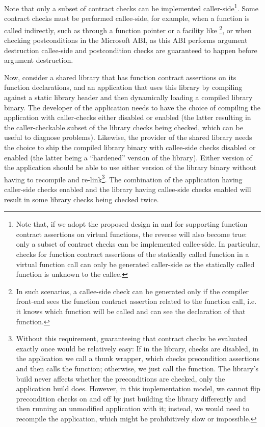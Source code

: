 Note that only a subset of contract checks can be implemented caller-side\footnote{Note that, if we adopt the proposed design in \cite{P3097R0} and \cite{P3165R0} for supporting function contract assertions on virtual functions, the reverse will also become true: only a subset of contract checks can be implemented callee-side. In particular, checks for function contract assertions of the statically called function in a virtual function call can only be generated caller-side as the statically called function is unknown to the callee.}. Some contract checks must be performed callee-side, for example, when a function is called indirectly, such as through a function pointer or a facility like \footnote{In such scenarios, a callee-side check can be generated only if the compiler front-end sees the function contract assertion related to the function call, i.e. it knows which function will be called and can see the declaration of that function.}, or when checking postconditions in the Microsoft ABI, as this ABI performs argument destruction callee-side and postcondition checks are guaranteed to happen before argument destruction. 

Now, consider a shared library that has function contract assertions on its function declarations, and an application that uses this library by compiling against a static library header and then dynamically loading a compiled library binary. The developer of the application needs to have the choice of compiling the application with caller-checks either disabled or enabled (the latter resulting in the caller-checkable subset of the library checks being checked, which can be useful to diagnose problems). Likewise, the provider of the shared library needs the choice to ship the compiled library binary with callee-side checks disabled or enabled (the latter being a ``hardened'' version of the library). Either version of the application should be able to use either version of the library binary without having to recompile and re-link\footnote{Without this requirement, guaranteeing that contract checks be evaluated exactly once would be relatively easy: If in the library, checks are disabled, in the application we call a thunk wrapper, which checks precondition assertions and then calls the function; otherwise, we just call the function. The library's build never affects whether the preconditions are checked, only the application build does. However, in this implementation model, we cannot flip precondition checks on and off by just building the library differently and then running an unmodified application with it; instead, we would need to recompile the application, which might be prohibitively slow or impossible.}. The combination of the application having caller-side checks enabled and the library having callee-side checks enabled will result in some library checks being checked twice. 

